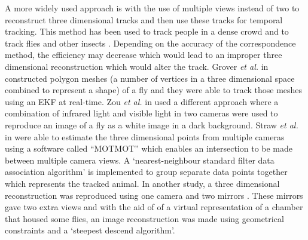 A more widely used approach is with the use of multiple views instead of two to reconstruct three dimensional tracks and then use these tracks for temporal tracking. This method has been used to track people in a dense crowd \cite{eshel2008homography} and to track flies and other insects \cite{grover2008fly, straw2010multi}. Depending on the accuracy of the correspondence method, the efficiency may decrease which would lead to an improper three dimensional reconstruction which would alter the track. Grover \textit{et al.} in \cite{grover2008fly} constructed polygon meshes (a number of vertices in a three dimensional space combined to represent a shape) of a fly and they were able to track those meshes using an EKF at real-time. Zou \textit{et al.} in \cite{zou2011recording} used a different approach where a combination of infrared light and visible light in two cameras were used to reproduce an image of a fly as a white image in a dark background. Straw \textit{et al.} in \cite{straw2010multi} were able to estimate the three dimensional points from multiple cameras using a software called ``MOTMOT'' \cite{straw2009motmot} which enables an intersection to be made between multiple camera views. A \lq nearest-neighbour standard filter data association algorithm' is implemented to group separate data points together which represents the tracked animal. In another study, a three dimensional reconstruction was reproduced using one camera and two mirrors \cite{kohlhoff2011ifly}. These mirrors gave two extra views and with the aid of of a virtual representation of a chamber that housed some flies, an image reconstruction was made using geometrical constraints and a \lq steepest descend algorithm\rq.

